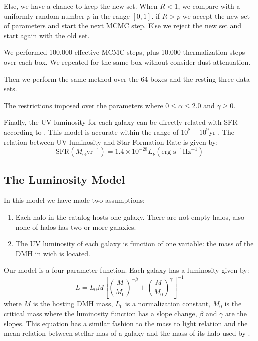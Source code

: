 \documentclass{emulateapj}
\begin{document}
Else, we have a chance to keep the new set. When $ R < 1$, we compare with a 
uniformly random number $p$ in the range $[0,1]$. if $ R>p$ we accept the new 
set of parameters and start the next MCMC step.  Else we reject the new set and 
start again with the old set.

We performed 100.000 effective MCMC steps, plus 10.000 thermalization steps over 
each box. We repeated for the same box without consider dust attenuation.

Then we perform the same method over the 64 boxes and the resting three data sets.

The restrictions imposed over the parameters where $0 \leq \alpha \leq 2.0 $  and 
$\gamma \geq 0$.


Finally, the UV luminosity for each galaxy can be directly related with SFR according 
to \citet{Madau98}.
This model is accurate within the range of $10^8 - 10^9 \textrm{yr}$
\citep{Kennicutt98}. The relation between UV luminosity and Star Formation Rate 
is given by:
\begin{equation}
 \textrm{SFR}\left(M_\odot \textrm{yr}^{-1}\right) 
      = 1.4 \times 10^{-28} L_{\nu} \left( \textrm{erg s}^{-1}\textrm{Hz}^{-1} 
	\right)
\end{equation}

\subsection{The Luminosity Model}

In this model we have made two assumptions:
\begin{enumerate}
 \item Each halo in the catalog hosts one galaxy. There are not empty
halos, also none of halos has two or more galaxies.
 \item The UV luminosity of each galaxy is function of one variable: the mass of
the DMH in wich is located.
\end{enumerate}
Our model is a four parameter function. Each galaxy has a luminosity given
by:
  \begin{equation}
  L = L_{0} M \left[ \left( \frac{M}{M_0}\right)^{-\beta} 
		   + \left( \frac{M}{M_0}\right)^{\gamma} 
               \right]^{-1}
  \end{equation}
where $M$ is the hosting DMH mass, $L_{0}$ is a normalization constant, $M_0$
is the critical mass where the luminosity function has a slope change, 
$\beta$ and $\gamma$ are the slopes. This equation has a similar fashion to the
mass to light relation \citep{vandenBosch03} and the mean relation between
stellar mas of a galaxy and the mass of its halo used by \cite{Moster10}.
\end{document}
